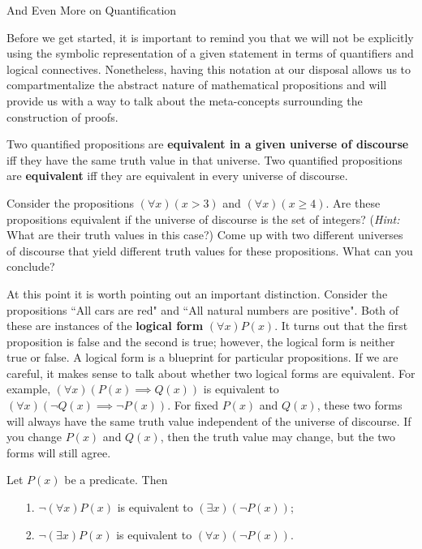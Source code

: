 \begin{section}{And Even More on Quantification}

Before we get started, it is important to remind you that we will not be explicitly using the symbolic representation of a given statement in terms of quantifiers and logical connectives.  Nonetheless, having this notation at our disposal allows us to compartmentalize the abstract nature of mathematical propositions and will provide us with a way to talk about the meta-concepts surrounding the construction of proofs.

\begin{definition}
Two quantified propositions are \textbf{equivalent in a given universe of discourse} iff they have the same truth value in that universe.  Two quantified propositions are \textbf{equivalent} iff they are equivalent in every universe of discourse.
\end{definition}

\begin{exercise}
Consider the propositions $(\forall x)(x>3)$ and $(\forall x)(x\geq 4)$.  Are these propositions equivalent if the universe of discourse is the set of integers?  (\emph{Hint:}  What are their truth values in this case?)  Come up with two different universes of discourse that yield different truth values for these propositions.  What can you conclude?
\end{exercise}

\begin{remark}
At this point it is worth pointing out an important distinction.  Consider the propositions ``All cars are red" and ``All natural numbers are positive".  Both of these are instances of the \textbf{logical form} $(\forall x)P(x)$.  It turns out that the first proposition is false and the second is true; however, the logical form is neither true or false.  A logical form is a blueprint for particular propositions.  If we are careful, it makes sense to talk about whether two logical forms are equivalent.  For example, $(\forall x)(P(x)\implies Q(x))$ is equivalent to $(\forall x)(\neg Q(x)\implies \neg P(x))$.  For fixed $P(x)$ and $Q(x)$, these two forms will always have the same truth value independent of the universe of discourse.  If you change $P(x)$ and $Q(x)$, then the truth value may change, but the two forms will still agree.
\end{remark}

\begin{theorem}\label{thm:negation of quantifiers}
Let $P(x)$ be a predicate.  Then
\begin{enumerate}
\item[1.] $\neg (\forall x)P(x)$ is equivalent to $(\exists x)(\neg P(x))$;
\item[2.] $\neg (\exists x)P(x)$ is equivalent to $(\forall x)(\neg P(x))$.
\end{enumerate}
\end{theorem}


\end{section}
